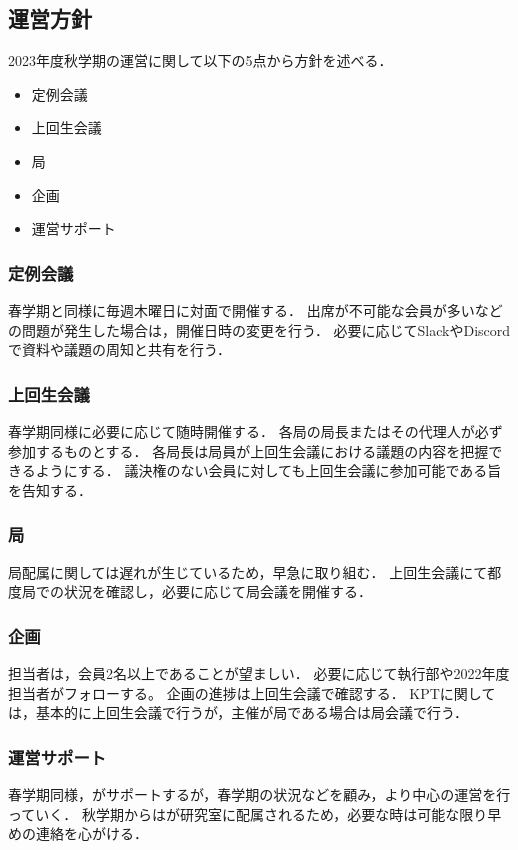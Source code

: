 \subsection*{運営方針}


2023年度秋学期の運営に関して以下の5点から方針を述べる．
\begin{itemize}
    \item 定例会議
    \item 上回生会議
    \item 局
    \item 企画
    \item 運営サポート
\end{itemize}

\subsubsection*{定例会議}
春学期と同様に毎週木曜日に対面で開催する．
出席が不可能な会員が多いなどの問題が発生した場合は，開催日時の変更を行う．
必要に応じてSlackやDiscordで資料や議題の周知と共有を行う．

\subsubsection*{上回生会議}
春学期同様に必要に応じて随時開催する．
各局の局長またはその代理人が必ず参加するものとする．
各局長は局員が上回生会議における議題の内容を把握できるようにする．
議決権のない会員に対しても上回生会議に参加可能である旨を告知する．

\subsubsection*{局}
局配属に関しては遅れが生じているため，早急に取り組む．
上回生会議にて都度局での状況を確認し，必要に応じて局会議を開催する．

\subsubsection*{企画}
担当者は，会員2名以上であることが望ましい．
必要に応じて執行部や2022年度担当者がフォローする。
企画の進捗は上回生会議で確認する．
KPTに関しては，基本的に上回生会議で行うが，主催が局である場合は局会議で行う．

\subsubsection*{運営サポート}
春学期同様，\thirdGrade{}がサポートするが，春学期の状況などを顧み，より\secondGrade{}中心の運営を行っていく．
秋学期からは\thirdGrade{}が研究室に配属されるため，必要な時は可能な限り早めの連絡を心がける．
